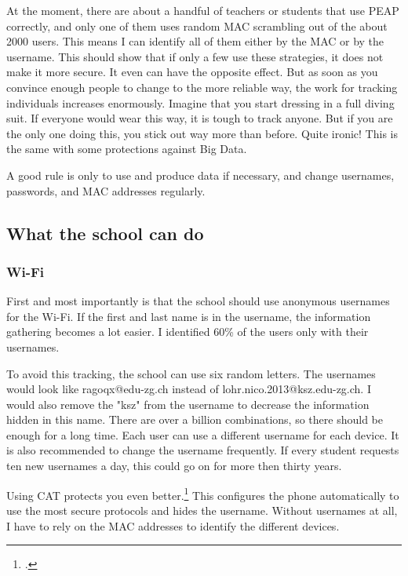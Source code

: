 \documentclass[paper=a4, fontsize=11pt]{article}
\begin{document}
At the moment, there are about a handful of teachers or students that use PEAP correctly, and only one of them uses random MAC scrambling out of the about 2000 users. This means I can identify all of them either by the MAC or by the username. This should show that if only a few use these strategies, it does not make it more secure. It even can have the opposite effect. But as soon as you convince enough people to change to the more reliable way, the work for tracking individuals increases enormously. Imagine that you start dressing in a full diving suit. If everyone would wear this way, it is tough to track anyone. But if you are the only one doing this, you stick out way more than before. Quite ironic! This is the same with some protections against Big Data.

A good rule is only to use and produce data if necessary, and change usernames, passwords, and MAC addresses regularly.


\subsection{What the school can do}

\subsubsection{Wi-Fi}


First and most importantly is that the school should use anonymous usernames for the Wi-Fi. If the first and last name is in the username, the information gathering becomes a lot easier. I identified 60\% of the users only with their usernames.



To avoid this tracking, the school can use six random letters. The usernames would look like ragoqx@edu-zg.ch instead of lohr.nico.2013@ksz.edu-zg.ch. I would also remove the "ksz" from the username to decrease the information hidden in this name. There are over a billion combinations, so there should be enough for a long time. Each user can use a different username for each device. It is also recommended to change the username frequently. If every student requests ten new usernames a day, this could go on for more then thirty years.

Using CAT protects you even better.\footcite{cateduroam}
This configures the phone automatically to use the most secure protocols and hides the username. Without usernames at all, I have to rely on the MAC addresses to identify the different devices.
\end{document}
